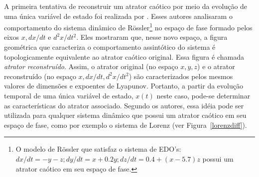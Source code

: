 A primeira tentativa de reconstruir um atrator caótico por meio da evolução de uma única variável de estado foi realizada por . Esses autores analisaram o comportamento do sistema dinâmico de Rössler\footnote{O modelo de Rössler que satisfaz o sistema de EDO's: $dx/dt=-y-z;dy/dt=x+0.2y;dz/dt=0.4+(x-5.7)z$ possui um atrator caótico em seu espaço de fase.} no espaço de fase formado pelos eixos $x,dx/dt$ e $d^{2}x/dt^2$. Eles mostraram que, nesse novo espaço, a figura geométrica que caracteriza o comportamento assintótico do sistema é topologicamente equivalente ao atrator caótico original. Essa figura é chamada \textit{atrator reconstruído}. Assim, o atrator original (no espaço $x,y,z$) e o atrator reconstruído (no espaço $x,dx/dt,d^{2}x/dt^{2}$) são caracterizados pelos mesmos valores de dimensões e expoentes de Lyapunov. Portanto, a partir da evolução temporal de uma única variável de estado, $x(t)$ neste caso, pode-se determinar as características do atrator associado. Segundo os autores, essa idéia pode ser utilizada para qualquer sistema dinâmico que possui um atrator caótico em seu espaço de fase, como por exemplo o sistema de Lorenz (ver Figura~\ref{lorenzdiff}).

